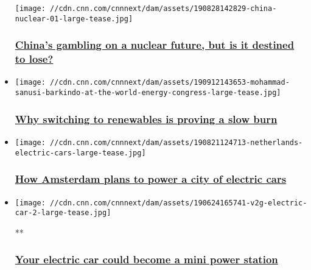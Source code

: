\begin{itemize}
  \texttt{[image: //cdn.cnn.com/cnnnext/dam/assets/190828142829-china-nuclear-01-large-tease.jpg]}

  \hypertarget{chinas-gambling-on-a-nuclear-future-but-is-it-destined-to-lose}{%
  \subsubsection{\texorpdfstring{\href{/2019/09/13/business/china-nuclear-climate-intl-hnk/index.html}{China's
  gambling on a nuclear future, but is it destined to
  lose?}}{China's gambling on a nuclear future, but is it destined to lose?}}\label{chinas-gambling-on-a-nuclear-future-but-is-it-destined-to-lose}}
\item
  \href{/2019/09/13/business/world-energy-congress-renewables/index.html}{}

  \texttt{[image: //cdn.cnn.com/cnnnext/dam/assets/190912143653-mohammad-sanusi-barkindo-at-the-world-energy-congress-large-tease.jpg]}

  \hypertarget{why-switching-to-renewables-is-proving-a-slow-burn-}{%
  \subsubsection{\texorpdfstring{\href{/2019/09/13/business/world-energy-congress-renewables/index.html}{Why
  switching to renewables is proving a slow burn
  }}{Why switching to renewables is proving a slow burn }}\label{why-switching-to-renewables-is-proving-a-slow-burn-}}
\item
  \href{/2019/08/26/business/amsterdam-zero-emissions-vehicles/index.html}{}

  \texttt{[image: //cdn.cnn.com/cnnnext/dam/assets/190821124713-netherlands-electric-cars-large-tease.jpg]}

  \hypertarget{how-amsterdam-plans-to-power-a-city-of-electric-cars}{%
  \subsubsection{\texorpdfstring{\href{/2019/08/26/business/amsterdam-zero-emissions-vehicles/index.html}{How
  Amsterdam plans to power a city of electric
  cars}}{How Amsterdam plans to power a city of electric cars}}\label{how-amsterdam-plans-to-power-a-city-of-electric-cars}}
\item
  \href{/videos/business/2019/06/24/v2g-tech-explained-global-energy-challenge-orig.cnn-business}{}

  \texttt{[image: //cdn.cnn.com/cnnnext/dam/assets/190624165741-v2g-electric-car-2-large-tease.jpg]}

  **

  \hypertarget{your-electric-car-could-become-a-mini-power-station}{%
  \subsubsection{\texorpdfstring{\href{/videos/business/2019/06/24/v2g-tech-explained-global-energy-challenge-orig.cnn-business}{Your
  electric car could become a mini power
  station}}{Your electric car could become a mini power station}}\label{your-electric-car-could-become-a-mini-power-station}}
\end{itemize}

